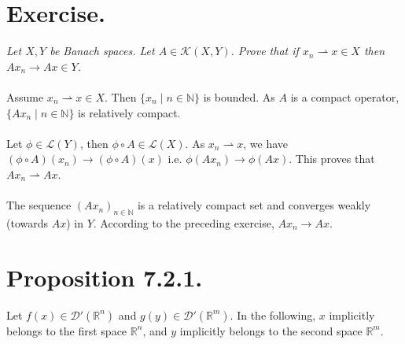 \documentclass[11pt,a4paper]{article}
\newcommand{\La}{\mathcal{L}}
\newcommand{\il}{\textit}
\newcommand{\N}{\mathbb{N}}
\newcommand{\R}{\mathbb{R}}
\newcommand{\1}{\mathbbm{1}}
\begin{document}
\section*{Exercise.}
\il{Let $X,Y$ be Banach spaces. Let $A \in \mathcal{K}(X,Y)$. Prove that if $x_n \rightharpoonup x \in X$ then $Ax_n \to Ax \in Y$.}\\\\
Assume $x_n \rightharpoonup x \in X$. Then $\{x_n \mid n\in\N \}$ is bounded. As $A$ is a compact operator, $\{ Ax_n \mid n\in\N\}$ is relatively compact.\\\\
Let $\phi \in \La(Y)$, then $\phi \circ A \in \La(X)$. As $x_n \rightharpoonup x$, we have $(\phi \circ A)(x_n) \to (\phi \circ A)(x)$ i.e. $\phi(Ax_n) \to \phi(Ax)$. This proves that $Ax_n \rightharpoonup Ax$.\\\\
The sequence $(Ax_n)_{n\in\N}$ is a relatively compact set and converges weakly (towards $Ax$) in $Y$. According to the preceding exercise, $Ax_n \to Ax$.\newpage

\section*{Proposition 7.2.1.}
Let $f(x) \in \mathcal{D}'(\R^n)$ and $g(y) \in \mathcal{D}'(\R^m)$. In the following, $x$ implicitly belongs to the first space $\R^n$, and $y$ implicitly belongs to the second space $\R^m$.
\end{document}
